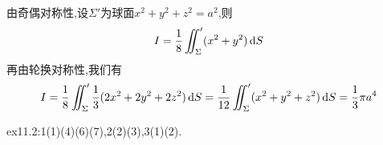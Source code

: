\begin{solution}
    由奇偶对称性,设$\Sigma'$为球面$x^2 + y^2 + z^2 = a^2$,则
    $$I = \frac{1}{8} \iint_\Sigma' (x^2 + y^2) \operatorname{d\!} S$$
    再由轮换对称性,我们有
    $$I = \frac{1}{8} \iint_\Sigma' \frac{1}{3} (2x^2 + 2y^2 + 2z^2) \operatorname{d\!} S = \frac{1}{12} \iint_\Sigma' (x^2 + y^2 + z^2) \operatorname{d\!} S = \frac{1}{3} \pi a^4$$
\end{solution}

\begin{homework}
    ex11.2:1(1)(4)(6)(7),2(2)(3),3(1)(2).
\end{homework}
















